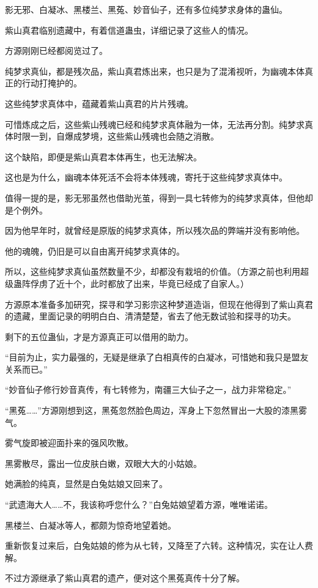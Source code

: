 \begin{this_body}
影无邪、白凝冰、黑楼兰、黑菟、妙音仙子，还有多位纯梦求身体的蛊仙。

紫山真君临别遗藏中，有着信道蛊虫，详细记录了这些人的情况。

方源刚刚已经都阅览过了。

纯梦求真仙，都是残次品，紫山真君炼出来，也只是为了混淆视听，为幽魂本体真正的行动打掩护的。

这些纯梦求真体中，蕴藏着紫山真君的片片残魂。

可惜炼成之后，这些紫山残魂已经和纯梦求真体融为一体，无法再分割。纯梦求真体时限一到，自爆成梦境，这些紫山残魂也会随之消散。

这个缺陷，即便是紫山真君本体再生，也无法解决。

这也是为什么，幽魂本体死活不会将本体残魂，寄托于这些纯梦求真体中。

值得一提的是，影无邪虽然也借助光茧，得到一具七转修为的纯梦求真体，但他却是个例外。

因为他早年时，就曾经是原版的纯梦求真体，所以残次品的弊端并没有影响他。

他的魂魄，仍旧是可以自由离开纯梦求真体的。

所以，这些纯梦求真仙虽然数量不少，却都没有栽培的价值。（方源之前也利用超级蛊阵俘虏了近十个，此时都放了出来，毕竟已经成了自家人。）

方源原本准备多加研究，探寻和学习影宗这种梦道造诣，但现在他得到了紫山真君的遗藏，里面记录的明明白白、清清楚楚，省去了他无数试验和探寻的功夫。

剩下的五位蛊仙，才是方源真正可以借用的助力。

“目前为止，实力最强的，无疑是继承了白相真传的白凝冰，可惜她和我只是盟友关系而已。”

“妙音仙子修行妙音真传，有七转修为，南疆三大仙子之一，战力非常稳定。”

“黑菟……”方源刚想到这，黑菟忽然脸色周边，浑身上下忽然冒出一大股的漆黑雾气。

雾气旋即被迎面扑来的强风吹散。

黑雾散尽，露出一位皮肤白嫩，双眼大大的小姑娘。

她满脸的纯真，显然是白兔姑娘又回来了。

“武遗海大人……不，我该称呼您什么？”白兔姑娘望着方源，唯唯诺诺。

黑楼兰、白凝冰等人，都颇为惊奇地望着她。

重新恢复过来后，白兔姑娘的修为从七转，又降至了六转。这种情况，实在让人费解。

不过方源继承了紫山真君的遗产，便对这个黑菟真传十分了解。


\end{this_body}
